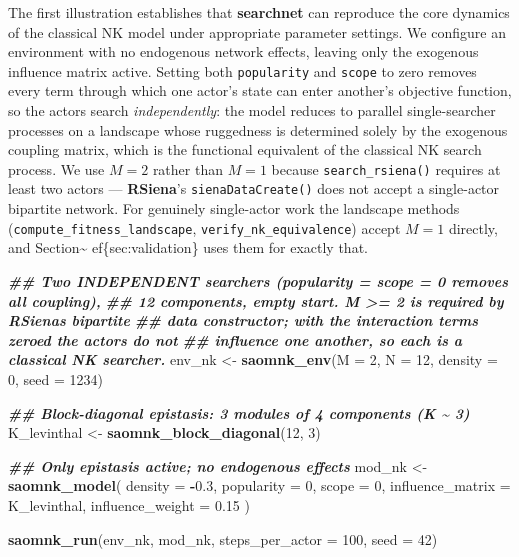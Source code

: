 \documentclass[
]{article}
\newenvironment{Shaded}{\begin{snugshade}}{\end{snugshade}}
\newcommand{\AttributeTok}[1]{\textcolor[rgb]{0.13,0.29,0.53}{#1}}
\newcommand{\DecValTok}[1]{\textcolor[rgb]{0.00,0.00,0.81}{#1}}
\newcommand{\DocumentationTok}[1]{\textcolor[rgb]{0.56,0.35,0.01}{\textbf{\textit{#1}}}}
\newcommand{\FloatTok}[1]{\textcolor[rgb]{0.00,0.00,0.81}{#1}}
\newcommand{\FunctionTok}[1]{\textcolor[rgb]{0.13,0.29,0.53}{\textbf{#1}}}
\newcommand{\NormalTok}[1]{#1}
\newcommand{\OtherTok}[1]{\textcolor[rgb]{0.56,0.35,0.01}{#1}}
\newcommand{\SpecialCharTok}[1]{\textcolor[rgb]{0.81,0.36,0.00}{\textbf{#1}}}
\begin{document}
The first illustration establishes that \textbf{searchnet} can reproduce
the core dynamics of the classical NK model under appropriate parameter
settings. We configure an environment with no endogenous network
effects, leaving only the exogenous influence matrix active. Setting
both \texttt{popularity} and \texttt{scope} to zero removes every term
through which one actor's state can enter another's objective function,
so the actors search \emph{independently}: the model reduces to parallel
single-searcher processes on a landscape whose ruggedness is determined
solely by the exogenous coupling matrix, which is the functional
equivalent of the classical NK search process. We use \(M = 2\) rather
than \(M = 1\) because \texttt{search\_rsiena()} requires at least two
actors --- \textbf{RSiena}'s \texttt{sienaDataCreate()} does not accept
a single-actor bipartite network. For genuinely single-actor work the
landscape methods (\texttt{compute\_fitness\_landscape},
\texttt{verify\_nk\_equivalence}) accept \(M = 1\) directly, and
Section\textasciitilde{} ef\{sec:validation\} uses them for exactly
that.

\begin{Shaded}
\begin{Highlighting}[]
\DocumentationTok{\#\# Two INDEPENDENT searchers (popularity = scope = 0 removes all coupling),}
\DocumentationTok{\#\# 12 components, empty start.  M \textgreater{}= 2 is required by RSiena\textquotesingle{}s bipartite}
\DocumentationTok{\#\# data constructor; with the interaction terms zeroed the actors do not}
\DocumentationTok{\#\# influence one another, so each is a classical NK searcher.}
\NormalTok{env\_nk }\OtherTok{\textless{}{-}} \FunctionTok{saomnk\_env}\NormalTok{(}\AttributeTok{M =} \DecValTok{2}\NormalTok{, }\AttributeTok{N =} \DecValTok{12}\NormalTok{, }\AttributeTok{density =} \DecValTok{0}\NormalTok{, }\AttributeTok{seed =} \DecValTok{1234}\NormalTok{)}

\DocumentationTok{\#\# Block{-}diagonal epistasis: 3 modules of 4 components (K \textasciitilde{} 3)}
\NormalTok{K\_levinthal }\OtherTok{\textless{}{-}} \FunctionTok{saomnk\_block\_diagonal}\NormalTok{(}\DecValTok{12}\NormalTok{, }\DecValTok{3}\NormalTok{)}

\DocumentationTok{\#\# Only epistasis active; no endogenous effects}
\NormalTok{mod\_nk }\OtherTok{\textless{}{-}} \FunctionTok{saomnk\_model}\NormalTok{(}
  \AttributeTok{density    =} \SpecialCharTok{{-}}\FloatTok{0.3}\NormalTok{,}
  \AttributeTok{popularity =} \DecValTok{0}\NormalTok{,}
  \AttributeTok{scope      =} \DecValTok{0}\NormalTok{,}
  \AttributeTok{influence\_matrix =}\NormalTok{ K\_levinthal,}
  \AttributeTok{influence\_weight =} \FloatTok{0.15}
\NormalTok{)}

\FunctionTok{saomnk\_run}\NormalTok{(env\_nk, mod\_nk, }\AttributeTok{steps\_per\_actor =} \DecValTok{100}\NormalTok{, }\AttributeTok{seed =} \DecValTok{42}\NormalTok{)}
\end{Highlighting}
\end{Shaded}
\end{document}
